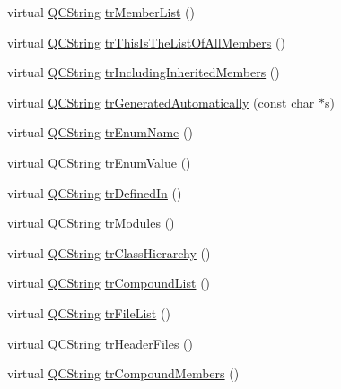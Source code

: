 \begin{DoxyCompactItemize}
\item 
virtual \mbox{\hyperlink{class_q_c_string}{Q\+C\+String}} \mbox{\hyperlink{class_translator_norwegian_a63b0bd2d8dd35d4f10c3240efecebbd7}{tr\+Member\+List}} ()
\item 
virtual \mbox{\hyperlink{class_q_c_string}{Q\+C\+String}} \mbox{\hyperlink{class_translator_norwegian_acf451810ff968f76cd5c729ce9540808}{tr\+This\+Is\+The\+List\+Of\+All\+Members}} ()
\item 
virtual \mbox{\hyperlink{class_q_c_string}{Q\+C\+String}} \mbox{\hyperlink{class_translator_norwegian_a91dc931102056f982b818724a0467a13}{tr\+Including\+Inherited\+Members}} ()
\item 
virtual \mbox{\hyperlink{class_q_c_string}{Q\+C\+String}} \mbox{\hyperlink{class_translator_norwegian_a6f6c402589db72a54a47c9e9e336a055}{tr\+Generated\+Automatically}} (const char $\ast$s)
\item 
virtual \mbox{\hyperlink{class_q_c_string}{Q\+C\+String}} \mbox{\hyperlink{class_translator_norwegian_a04e9862bef83ebecd84588fe34f3c246}{tr\+Enum\+Name}} ()
\item 
virtual \mbox{\hyperlink{class_q_c_string}{Q\+C\+String}} \mbox{\hyperlink{class_translator_norwegian_a7b2dc9ecbf53486bbbed091e5686ad1d}{tr\+Enum\+Value}} ()
\item 
virtual \mbox{\hyperlink{class_q_c_string}{Q\+C\+String}} \mbox{\hyperlink{class_translator_norwegian_aad63bbbec277c04ed4d2e6f96e48ab3c}{tr\+Defined\+In}} ()
\item 
virtual \mbox{\hyperlink{class_q_c_string}{Q\+C\+String}} \mbox{\hyperlink{class_translator_norwegian_af296fbd95136709a9c6d0f0a3000598d}{tr\+Modules}} ()
\item 
virtual \mbox{\hyperlink{class_q_c_string}{Q\+C\+String}} \mbox{\hyperlink{class_translator_norwegian_a8b82605ff19493a2549e3946de02a076}{tr\+Class\+Hierarchy}} ()
\item 
virtual \mbox{\hyperlink{class_q_c_string}{Q\+C\+String}} \mbox{\hyperlink{class_translator_norwegian_ae4512251b3bf5e961cd39e4007daf159}{tr\+Compound\+List}} ()
\item 
virtual \mbox{\hyperlink{class_q_c_string}{Q\+C\+String}} \mbox{\hyperlink{class_translator_norwegian_a5b81b0c810a3c96109a245eb5cf61c7c}{tr\+File\+List}} ()
\item 
virtual \mbox{\hyperlink{class_q_c_string}{Q\+C\+String}} \mbox{\hyperlink{class_translator_norwegian_a112b93cfd3c13f5a7a35806c9898b8ec}{tr\+Header\+Files}} ()
\item 
virtual \mbox{\hyperlink{class_q_c_string}{Q\+C\+String}} \mbox{\hyperlink{class_translator_norwegian_a5fecba8518aa19f0ff8d78a3e7f6acc8}{tr\+Compound\+Members}} ()

\end{DoxyCompactItemize}
